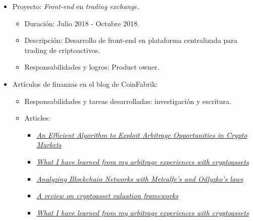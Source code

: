 \documentclass[11pt,a4paper,sans]{moderncv}        %
\begin{document}
{\begin{itemize}
	\begin{itemize}%
	\item Duración: Agosto 2018 - Octubre 2018.
	\item Descripción: Descentralización de Taringa!, la red social latinoamericana con ~500k usuarios activos diarios.
	\item esponsabilidades y tareas desarrolladas: Diseño de la descentralización general de la plataforma,
	incluyendo arquitectura, dinámica de token, incentivos y economía.
	\end{itemize}
\item Proyecto: \textit{Front-end} en \textit{trading exchange}.
	\begin{itemize}%
	\item Duración: Julio 2018 - Octubre 2018.
	\item Descripción: Desarrollo de front-end en plataforma centralizada para trading de criptoactivos.
	\item Responsabilidades y logros: Product owner.
	\end{itemize}
\item Artículos de finanzas en el blog de CoinFabrik:
	\begin{itemize}%
	\item Responsabilidades y tareas desarrolladas: investigación y escritura.
	\item Articles:
		\begin{itemize}
			\item \href{https://blog.coinfabrik.com/an-efficient-algorithm-to-exploit-arbitrage-opportunities-in-crypto-markets/}{\textit{An Efficient Algorithm to Exploit Arbitrage Opportunities in Crypto Markets}}
		\item \href{https://blog.coinfabrik.com/what-i-have-learned-from-my-arbitrage-experiences-with-cryptoassets/}{\textit{What I have learned from my arbitrage experiences with cryptoassets}}
		\item \href{https://blog.coinfabrik.com/analyzing-blockchain-networks-with-metcafes-and-odlyzkos-laws/}{\textit{Analyzing Blockchain Networks with Metcalfe’s and Odlyzko’s laws}}
		\item \href{https://blog.coinfabrik.com/a-review-on-cryptoasset-valuation-frameworks/}{\textit{A review on cryptoasset valuation frameworks}}
		\item \href{https://blog.coinfabrik.com/what-i-have-learned-from-my-arbitrage-experiences-with-cryptoassets/}{\textit{What I have learned from my arbitrage experiences with cryptoassets}}
		\end{itemize}	
	\end{itemize}
\end{itemize}
}
\end{document}
